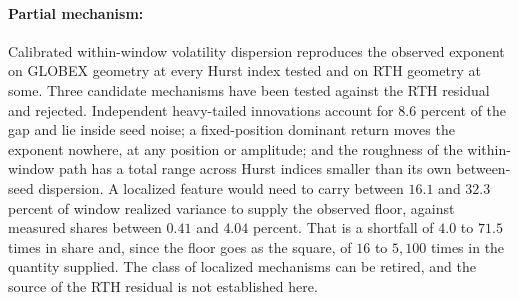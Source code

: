 \paragraph{Partial mechanism:} Calibrated within-window volatility
dispersion reproduces the observed exponent on GLOBEX geometry at every Hurst
index tested and on RTH geometry at some. Three candidate mechanisms have been
tested against the RTH residual and rejected. Independent heavy-tailed
innovations account for $8.6$ percent of the gap and lie inside seed noise; a
fixed-position dominant return moves the exponent nowhere, at any position or
amplitude; and the roughness of the within-window path has a total range across
Hurst indices smaller than its own between-seed dispersion. A localized feature would
need to carry between $16.1$ and $32.3$ percent of window realized variance to %
supply the observed floor, against measured shares between $0.41$ and $4.04$
percent. That is a shortfall of $4.0$ to $71.5$ times in share and, since the
floor goes as the square, of $16$ to $5{,}100$ times in the quantity supplied. %
The class of localized mechanisms can be retired, and the source of the RTH
residual is not established here.

